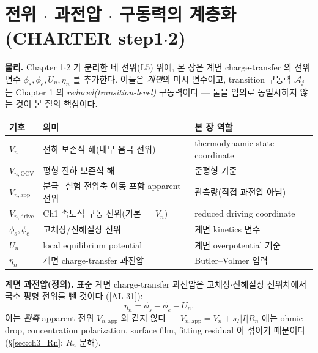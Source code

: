 \documentclass[11pt,a4paper]{article}
\newcommand{\app}{\mathrm{app}}
\newcommand{\drive}{\mathrm{drive}}
\newcommand{\OCV}{\mathrm{OCV}}
\newcommand{\AL}[1]{\textsf{[AL-#1]}}
\begin{document}
\section{전위 $\cdot$ 과전압 $\cdot$ 구동력의 계층화 (CHARTER step1$\cdot$2)}\label{sec:ch3_potentials}
\textbf{물리.} Chapter 1$\cdot$2 가 분리한 네 전위(L5) 위에, 본 장은 계면 charge-transfer 의 전위 변수
$\phi_s,\phi_e,U_n,\eta_n$ 를 추가한다. 이들은 \emph{계면}의 미시 변수이고, transition 구동력 $\mathcal A_j$ 는
Chapter 1 의 \emph{reduced(transition-level)} 구동력이다 — 둘을 임의로 동일시하지 않는 것이 본 절의 핵심이다.
{\setlength{\tabcolsep}{4pt}
\begin{longtable}{p{} >{\raggedright\arraybackslash}p{} >{\raggedright\arraybackslash}p{}}
\toprule 기호 & 의미 & 본 장 역할 \\ \midrule \endhead
$V_n$ & 전하 보존식 해(내부 음극 전위) & thermodynamic state coordinate \\
$V_{n,\OCV}$ & 평형 전하 보존식 해 & 준평형 기준 \\
$V_{n,\app}$ & 분극+실험 전압축 이동 포함 apparent 전위 & 관측량(직접 과전압 아님) \\
$V_{n,\drive}$ & Ch1 속도식 구동 전위(기본 $=V_n$) & reduced driving coordinate \\
$\phi_s,\phi_e$ & 고체상/전해질상 전위 & 계면 kinetics 변수 \\
$U_n$ & local equilibrium potential & 계면 overpotential 기준 \\
$\eta_n$ & 계면 charge-transfer 과전압 & Butler--Volmer 입력 \\
\bottomrule
\end{longtable}}
\textbf{계면 과전압(정의).} 표준 계면 charge-transfer 과전압은 고체상$\cdot$전해질상 전위차에서 국소 평형
전위를 뺀 것이다 \cite{bardfaulkner,newman}(\AL{31}):
\begin{equation}
\eta_n=\phi_s-\phi_e-U_n.
\label{eq:ch3_eta_standard}
\end{equation}
이는 \emph{관측} apparent 전위 $V_{n,\app}$ 와 같지 않다 — $V_{n,\app}=V_n+s_I|I|R_n$ 에는 ohmic drop,
concentration polarization, surface film, fitting residual 이 섞이기 때문이다(\S\ref{sec:ch3_Rn}; $R_n$ 분해).
\end{document}
